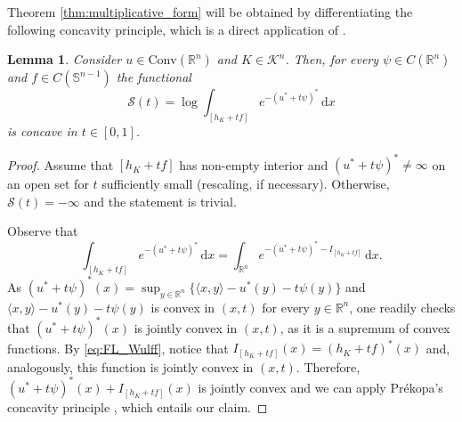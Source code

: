 \documentclass[a4paper, 11pt]{article}
\newcommand{\R}{\mathbb{R}}
\newcommand{\sph}{\mathbb{S}}
\newcommand{\K}{\mathcal{K}}
\newtheorem{lemma}[theorem]{Lemma}
\theoremstyle{definition}
\newcommand{\Conv}{\mathrm{Conv}}
\newcommand{\di}{\, \mathrm{d}}
\newcommand{\F}{\mathcal{S}}
\begin{document}
\medskip

Theorem \ref{thm:multiplicative_form} will be obtained by differentiating the following concavity principle, which is a direct application of \cite[Theorem 6]{Prekopa}.
\begin{lemma}\label{lemma:concavity_principle_PL}
    Consider $u \in \Conv(\R^n)$ and $K \in \K^n$. Then, for every $\psi \in C(\R^n)$ and $f \in C(\sph^{n-1})$ the functional
    \begin{equation}\label{eq:conc_pr}
        \F(t)= \log \int_{[h_K + tf]} e^{-(u^*+t\psi)^*} \di x
    \end{equation}
    is concave in $t \in [0,1]$.
\end{lemma}
\begin{proof}
    Assume that $[h_K + tf]$ has non-empty interior and $(u^*+t\psi)^* \neq \infty$ on an open set for $t$ sufficiently small (rescaling, if necessary). Otherwise, $\F(t)=-\infty$ and the statement is trivial. 
    
    Observe that \[ \int_{[h_K + tf]} e^{-(u^*+t\psi)^*} \di x = \int_{\R^n} e^{-(u^*+t\psi)^* - I_{[h_K + tf]}} \di x. \] 
    As $(u^*+t\psi)^*(x)=\sup_{y \in \R^n} \{\langle x, y \rangle - u^*(y) - t \psi(y) \}$ and $\langle x, y \rangle - u^*(y) - t \psi(y)$ is convex in $(x,t)$ for every $y \in \R^n$, one readily checks that $(u^*+t\psi)^*(x)$ is jointly convex in $(x,t)$, as it is a supremum of convex functions. By \eqref{eq:FL_Wulff}, notice that $I_{[h_K+tf]}(x)=(h_K+tf)^*(x)$ and, analogously, this function is jointly convex in $(x,t)$. Therefore, $(u^*+t\psi)^*(x) + I_{[h_K + tf]}(x)$ is jointly convex and we can apply Pr\'ekopa's concavity principle \cite[Theorem 6]{Prekopa}, which entails our claim.
\end{proof}
\end{document}
